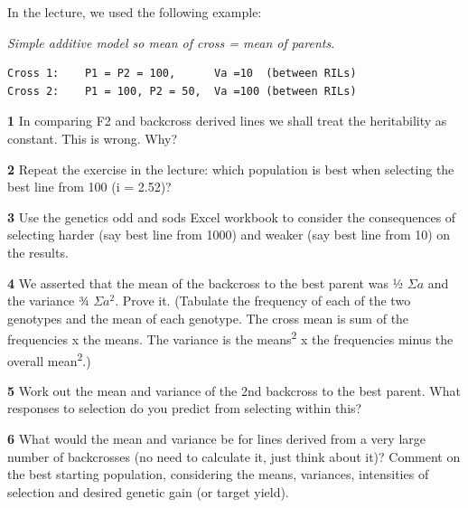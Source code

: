 \documentclass[
]{book}
\makeatletter
\newenvironment{kframe}{%
\medskip{}
\setlength{\fboxsep}{.8em}
 \def\at@end@of@kframe{}%
 \ifinner\ifhmode%
  \def\at@end@of@kframe{\end{minipage}}%
  \begin{minipage}{\columnwidth}%
 \fi\fi%
 \def\FrameCommand##1{\hskip\@totalleftmargin \hskip-\fboxsep
 \colorbox{shadecolor}{##1}\hskip-\fboxsep
     \hskip-\linewidth \hskip-\@totalleftmargin \hskip\columnwidth}%
 \MakeFramed {\advance\hsize-\width
   \@totalleftmargin\z@ \linewidth\hsize
   \@setminipage}}%
 {\par\unskip\endMakeFramed%
 \at@end@of@kframe}
\newenvironment{rmdblock}[1]
  {
  \begin{itemize}
  \renewcommand{\labelitemi}{
    \raisebox{-.7\height}[0pt][0pt]{
      {\setkeys{Gin}{width=3em,keepaspectratio}\texttt{[image: images/\#1]}}
    }
  }
  \setlength{\fboxsep}{1em}
  \begin{kframe}
  \item
  }
  {
  \end{kframe}
  \end{itemize}
  }
\newenvironment{rmdquiz}
  {\begin{rmdblock}{quiz}}
  {\end{rmdblock}}
\makeatother
\begin{document}
In the lecture, we used the following example:

\emph{Simple additive model so mean of cross = mean of parents}.

\begin{verbatim}
Cross 1:    P1 = P2 = 100,      Va =10  (between RILs)
Cross 2:    P1 = 100, P2 = 50,  Va =100 (between RILs)
\end{verbatim}

\begin{rmdquiz}
\textbf{1}
In comparing F2 and backcross derived lines we shall treat the heritability as constant. This is wrong. Why?
\end{rmdquiz}

\begin{rmdquiz}
\textbf{2}
Repeat the exercise in the lecture: which population is best when selecting the best line from 100 (i = 2.52)?
\end{rmdquiz}

\begin{rmdquiz}
\textbf{3}
Use the genetics odd and sods Excel workbook to consider the consequences of selecting harder (say best line from 1000) and weaker (say best line from 10) on the results.
\end{rmdquiz}

\begin{rmdquiz}
\textbf{4}
We asserted that the mean of the backcross to the best parent was ½ \(Σa\) and the variance
¾ \(Σa^2\). Prove it. (Tabulate the frequency of each of the two genotypes and the mean of each genotype. The cross mean is sum of the frequencies x the means. The variance is the means\textsuperscript{2} x the frequencies minus the overall mean\textsuperscript{2}.)
\end{rmdquiz}

\begin{rmdquiz}
\textbf{5}
Work out the mean and variance of the 2nd backcross to the best parent. What responses to selection do you predict from selecting within this?
\end{rmdquiz}

\begin{rmdquiz}
\textbf{6}
What would the mean and variance be for lines derived from a very large number of backcrosses (no need to calculate it, just think about it)? Comment on the best starting population, considering the means, variances, intensities of selection and desired genetic gain (or target yield).
\end{rmdquiz}
\end{document}
